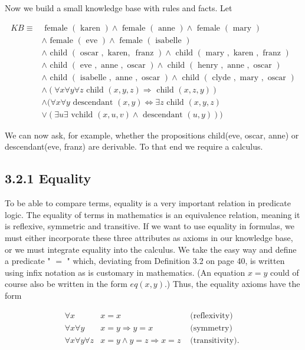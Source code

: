 \documentclass[10pt]{article}
\begin{document}
Now we build a small knowledge base with rules and facts. Let

$$
\begin{aligned}
K B \equiv & \text { female }(\text { karen }) \wedge \text { female }(\text { anne }) \wedge \text { female }(\text { mary }) \\
& \wedge \text { female }(\text { eve }) \wedge \text { female }(\text { isabelle }) \\
& \wedge \text { child }(\text { oscar }, \text { karen, } \text { franz }) \wedge \text { child }(\text { mary }, \text { karen }, \text { franz }) \\
& \wedge \text { child }(\text { eve }, \text { anne }, \text { oscar }) \wedge \text { child }(\text { henry }, \text { anne }, \text { oscar }) \\
& \wedge \text { child }(\text { isabelle }, \text { anne }, \text { oscar }) \wedge \text { child }(\text { clyde }, \text { mary }, \text { oscar }) \\
& \wedge(\forall x \forall y \forall z \text { child }(x, y, z) \Rightarrow \text { child }(x, z, y)) \\
& \wedge(\forall x \forall y \text { descendant }(x, y) \Leftrightarrow \exists z \text { child }(x, y, z) \\
& \vee(\exists u \exists \text { vchild }(x, u, v) \wedge \text { descendant }(u, y)))
\end{aligned}
$$

We can now ask, for example, whether the propositions child(eve, oscar, anne) or descendant(eve, franz) are derivable. To that end we require a calculus.

\subsection*{3.2.1 Equality}
To be able to compare terms, equality is a very important relation in predicate logic. The equality of terms in mathematics is an equivalence relation, meaning it is reflexive, symmetric and transitive. If we want to use equality in formulas, we must either incorporate these three attributes as axioms in our knowledge base, or we must integrate equality into the calculus. We take the easy way and define a predicate " $=$ " which, deviating from Definition 3.2 on page 40, is written using infix notation as is customary in mathematics. (An equation $x=y$ could of course also be written in the form $e q(x, y)$.) Thus, the equality axioms have the form

\[
\begin{array}{rll}
\forall x & x=x & \text { (reflexivity) } \\
\forall x \forall y & x=y \Rightarrow y=x & \text { (symmetry) }  \tag{3.1}\\
\forall x \forall y \forall z & x=y \wedge y=z \Rightarrow x=z & \text { (transitivity). }
\end{array}
\]
\end{document}
